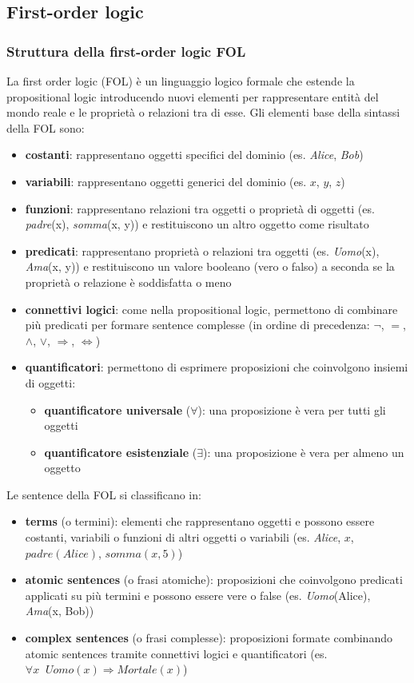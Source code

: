 \newpage

\subsection{First-order logic}
\subsubsection*{Struttura della first-order logic FOL}
La first order logic (FOL) è un linguaggio logico formale che estende la propositional logic introducendo nuovi elementi 
per rappresentare entità del mondo reale e le proprietà o relazioni tra di esse.
Gli elementi base della sintassi della FOL sono:
\begin{itemize}
	\item \textbf{costanti}: rappresentano oggetti specifici del dominio (es. \textit{Alice}, \textit{Bob})
	\item \textbf{variabili}: rappresentano oggetti generici del dominio (es. \(x\), \(y\), \(z\))
	\item \textbf{funzioni}: rappresentano relazioni tra oggetti o proprietà di oggetti (es. \textit{padre}(x),
	\textit{somma}(x, y)) e restituiscono un altro oggetto come risultato
	\item \textbf{predicati}: rappresentano proprietà o relazioni tra oggetti (es. \textit{Uomo}(x), \textit{Ama}(x, y))
	e restituiscono un valore booleano (vero o falso) a seconda se la proprietà o relazione è soddisfatta o meno
	\item \textbf{connettivi logici}: come nella propositional logic, permettono di combinare più predicati per formare
	sentence complesse (in ordine di precedenza: \(\neg\), \(=\), \(\land\), \(\lor\), \(\Rightarrow\), \(\Leftrightarrow\))
	\item \textbf{quantificatori}: permettono di esprimere proposizioni che coinvolgono insiemi di oggetti:
	\begin{itemize}[topsep=0pt]
		\item \textbf{quantificatore universale} (\(\forall\)): una proposizione è vera per tutti gli oggetti
		\item \textbf{quantificatore esistenziale} (\(\exists\)): una proposizione è vera per almeno un oggetto
	\end{itemize}
\end{itemize}
Le sentence della FOL si classificano in:
\begin{itemize}
	\item \textbf{terms} (o termini): elementi che rappresentano oggetti e possono essere costanti, variabili o funzioni
	di altri oggetti o variabili (es. \textit{Alice}, \(x\), \(padre(Alice)\), \(somma(x, 5)\))
	\item \textbf{atomic sentences} (o frasi atomiche): proposizioni che coinvolgono predicati applicati su più termini
	e possono essere vere o false (es. \textit{Uomo}(Alice), \textit{Ama}(x, Bob))
	\item \textbf{complex sentences} (o frasi complesse): proposizioni formate combinando atomic sentences tramite
	connettivi logici e quantificatori (es. \(\forall x \;\; Uomo(x) \Rightarrow Mortale(x)\))
\end{itemize}

